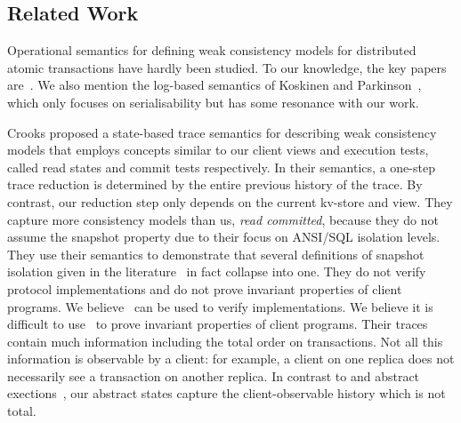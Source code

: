 \subsection{Related Work} 
\label{sec:newrelated}

Operational semantics for defining weak consistency models for
distributed atomic transactions have hardly been
studied. To our knowledge, the key papers
are~\cite{seebelieve,sureshConcur,alonetogether}. 
We also mention the log-based semantics of Koskinen and Parkinson~\citet{push-pull},
which only focuses on serialisability but has some resonance with our work. 

Crooks \etal\citet{seebelieve} proposed a state-based trace
semantics for describing weak consistency models that employs concepts
similar to our client views and execution tests, called read states and
commit tests respectively.  In their semantics, a one-step trace
reduction is determined by the entire previous history of the trace.
By contrast, our reduction step only depends on the current kv-store
and view.  They capture more consistency models than us, \eg\emph{
  read committed}, because they do not assume the snapshot property
due to their focus on ANSI/SQL isolation levels. They use their semantics to 
demonstrate that 
several definitions of snapshot isolation given in the
literature~\cite{si,lazy-si,geo-si} in fact collapse into one.  They do not verify
protocol implementations and do not prove invariant properties of
client programs.  We believe~\cite{seebelieve} can be used to verify
implementations. We believe it is difficult to use~\cite{seebelieve}
to prove invariant properties of client programs.  Their 
traces contain much information including \eg the total
order on transactions. Not all this information is  observable by a
client: for example,  a client on one replica does not necessarily see
a transaction on another replica. In contrast to \cite{seebelieve} and abstract
exections~\cite{ev_transactions,framework-concur},  our abstract
states  capture the  client-observable history
which is not total. 

